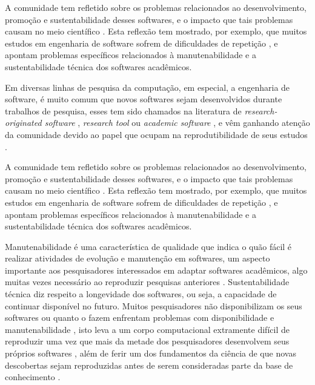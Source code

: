 
A comunidade tem refletido sobre os problemas relacionados ao
desenvolvimento, promoção e sustentabilidade desses softwares, e o
impacto que tais problemas causam no meio científico \cite{allen2017engineering}. Esta
reflexão tem mostrado, por exemplo, que muitos estudos em engenharia de
software sofrem de dificuldades de repetição \cite{Tang2016}, e apontam
problemas específicos relacionados à manutenabilidade e a sustentabilidade
técnica dos softwares acadêmicos.

Em diversas linhas de pesquisa da computação, em especial, a engenharia de
software, é muito comum que novos softwares sejam desenvolvidos durante
trabalhos de pesquisa, esses tem sido chamados na literatura de {\it
research-originated software} \cite{Kon2011}, {\it research tool}
\cite{Portillo12} ou {\it academic software} \cite{allen2017engineering}, e vêm
ganhando atenção da comunidade devido ao papel que ocupam na reprodutibilidade
de seus estudos \cite{Peng2011}.

A comunidade tem refletido sobre os problemas relacionados ao
desenvolvimento, promoção e sustentabilidade desses softwares, e o
impacto que tais problemas causam no meio científico \cite{allen2017engineering}. Esta
reflexão tem mostrado, por exemplo, que muitos estudos em engenharia de
software sofrem de dificuldades de repetição \cite{Tang2016}, e apontam
problemas específicos relacionados à manutenabilidade e a sustentabilidade
técnica dos softwares acadêmicos.

Manutenabilidade é uma característica de qualidade que indica o quão fácil é
realizar atividades de evolução e manutenção em softwares, um aspecto
importante aos pesquisadores interessados em adaptar softwares acadêmicos, algo
muitas vezes necessário ao reproduzir pesquisas anteriores \cite{Peng2011}.
Sustentabilidade técnica diz respeito a longevidade dos softwares, ou seja, a
capacidade de continuar disponível no futuro. Muitos pesquisadores não
disponibilizam os seus softwares \cite{robles2010replicating,
amann2015software} ou quanto o fazem enfrentam problemas com disponibilidade e
manutenabilidade \cite{Prlic2012}, isto leva a um corpo computacional
extramente difícil de reproduzir uma vez que mais da metade dos pesquisadores
desenvolvem seus próprios softwares \cite{hettrick_2014_14809}, além de ferir um dos
fundamentos da ciência de que novas descobertas sejam reproduzidas antes de
serem consideradas parte da base de conhecimento \cite{Stodden2009}.

